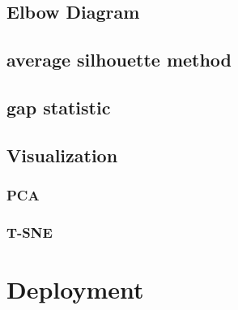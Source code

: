 	\subsection{Elbow Diagram}
	\subsection{average silhouette method}
	\subsection{gap statistic}
	\subsection{Visualization}
		\subsubsection{PCA}
		\subsubsection{T-SNE}
\section{Deployment}
